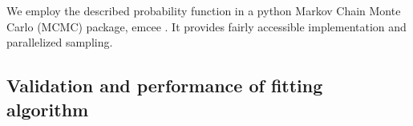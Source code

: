 \documentclass[onecolumn,traditabstract]{aa}
\begin{document}
We employ the described probability function in a python Markov Chain Monte Carlo (MCMC) package, emcee \citep{foreman2013}.
It provides fairly accessible implementation and parallelized sampling. 



\subsection{Validation and performance of fitting algorithm}
\label{sec:validity}
\end{document}
